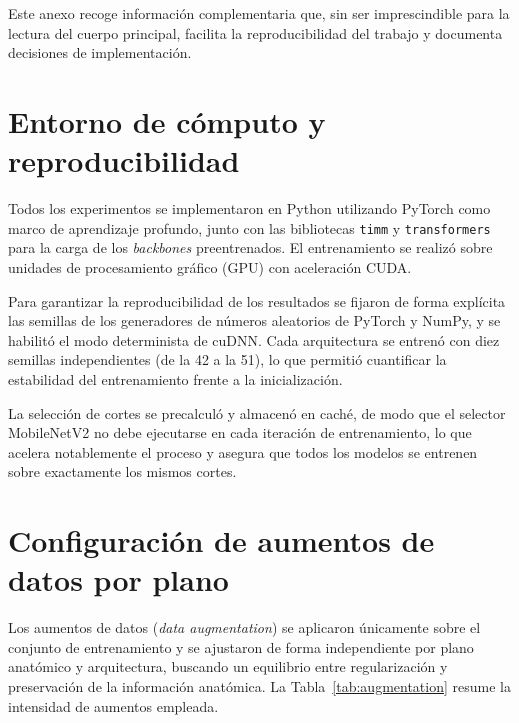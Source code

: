 
Este anexo recoge información complementaria que, sin ser imprescindible para la lectura del cuerpo principal, facilita la reproducibilidad del trabajo y documenta decisiones de implementación.

\section{Entorno de cómputo y reproducibilidad}

Todos los experimentos se implementaron en Python utilizando PyTorch como marco de aprendizaje profundo, junto con las bibliotecas \texttt{timm} y \texttt{transformers} para la carga de los \textit{backbones} preentrenados. El entrenamiento se realizó sobre unidades de procesamiento gráfico (GPU) con aceleración CUDA.

Para garantizar la reproducibilidad de los resultados se fijaron de forma explícita las semillas de los generadores de números aleatorios de PyTorch y NumPy, y se habilitó el modo determinista de cuDNN. Cada arquitectura se entrenó con diez semillas independientes (de la 42 a la 51), lo que permitió cuantificar la estabilidad del entrenamiento frente a la inicialización.

La selección de cortes se precalculó y almacenó en caché, de modo que el selector MobileNetV2 no debe ejecutarse en cada iteración de entrenamiento, lo que acelera notablemente el proceso y asegura que todos los modelos se entrenen sobre exactamente los mismos cortes.

\section{Configuración de aumentos de datos por plano}

Los aumentos de datos (\textit{data augmentation}) se aplicaron únicamente sobre el conjunto de entrenamiento y se ajustaron de forma independiente por plano anatómico y arquitectura, buscando un equilibrio entre regularización y preservación de la información anatómica. La Tabla~\ref{tab:augmentation} resume la intensidad de aumentos empleada.

